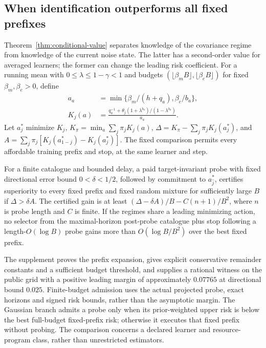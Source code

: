 \subsection{When identification outperforms all fixed prefixes}
Theorem~\ref{thm:conditional-value} separates knowledge of the covariance regime from knowledge of the current noise state.
The latter has a second-order value for averaged learners; the former can change the leading risk coefficient.
For a running mean with $0\le\lambda\le1-\gamma<1$ and budgets $(\lfloor\beta_m B\rfloor,\lfloor\beta_e B\rfloor)$ for fixed $\beta_m,\beta_e>0$, define
\begin{align*}
a_a&=\min\{\beta_m/(h+q_a),\beta_e/b_a\},\\
K_j(a)&=\frac{q_a^{-1}+\theta_j(1+\lambda^{b_a})/(1-\lambda^{b_a})}{a_a}.
\end{align*}
Let $a_j^*$ minimize $K_j$, $K_\pi=\min_a\sum_j\pi_jK_j(a)$,
$\Delta=K_\pi-\sum_j\pi_jK_j(a_j^*)$, and
$A=\sum_j\pi_j[K_j(a_{1-j}^*)-K_j(a_j^*)]$.
The fixed comparison permits every affordable training prefix and stop, at the same learner and step.

\begin{corollary}
For a finite catalogue and bounded delay, a paid target-invariant probe with fixed directional error bound $0<\delta<1/2$, followed by commitment to $a_{\widehat j}^*$, certifies superiority to every fixed prefix and fixed random mixture for sufficiently large $B$ if $\Delta>\delta A$.
The certified gain is at least $(\Delta-\delta A)/B-C(n+1)/B^2$, where $n$ is probe length and $C$ is finite.
If the regimes share a leading minimizing action, no selector from the maximal-horizon post-probe catalogue plus stop following a length-$O(\log B)$ probe gains more than $O(\log B/B^2)$ over the best fixed prefix.
\label{cor:leading-prefix-separation}
\end{corollary}

The supplement proves the prefix expansion, gives explicit conservative remainder constants and a sufficient budget threshold, and supplies a rational witness on the public grid with a positive leading margin of approximately $0.07765$ at directional bound $0.025$.
Finite-budget admission uses the actual projected probe, exact horizons and signed risk bounds, rather than the asymptotic margin.
The Gaussian branch admits a probe only when its prior-weighted upper risk is below the best full-budget fixed-prefix risk; otherwise it executes that fixed prefix without probing.
The comparison concerns a declared learner and resource-program class, rather than unrestricted estimators.
